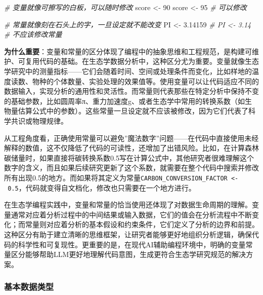 \documentclass[
  twoside]{book}
\newenvironment{Shaded}{\begin{snugshade}}{\end{snugshade}}
\newcommand{\CommentTok}[1]{\textcolor[rgb]{0.56,0.35,0.01}{\textit{#1}}}
\newcommand{\DecValTok}[1]{\textcolor[rgb]{0.00,0.00,0.81}{#1}}
\newcommand{\FloatTok}[1]{\textcolor[rgb]{0.00,0.00,0.81}{#1}}
\newcommand{\NormalTok}[1]{#1}
\newcommand{\OtherTok}[1]{\textcolor[rgb]{0.56,0.35,0.01}{#1}}
\begin{document}
\begin{Shaded}
\begin{Highlighting}[]
\CommentTok{\# 变量就像可擦写的白板，可以随时修改}
\NormalTok{score }\OtherTok{\textless{}{-}} \DecValTok{90}
\NormalTok{score }\OtherTok{\textless{}{-}} \DecValTok{95}  \CommentTok{\# 可以修改}

\CommentTok{\# 常量就像刻在石头上的字，一旦设定就不能改变}
\NormalTok{PI }\OtherTok{\textless{}{-}} \FloatTok{3.14159}
\CommentTok{\# PI \textless{}{-} 3.14  \# 不应该修改常量}
\end{Highlighting}
\end{Shaded}

\textbf{为什么重要}：变量和常量的区分体现了编程中的抽象思维和工程规范，是构建可维护、可复用代码的基础。在生态学数据分析中，这种区分尤为重要。变量就像生态学研究中的测量指标------它们会随着时间、空间或处理条件而变化，比如样地的温度读数、物种的个体数量、实验处理的效果值等。使用变量可以让代码适应不同的数据输入，实现分析的通用性和灵活性。而常量则代表那些在特定分析中保持不变的基础参数，比如圆周率π、重力加速度g、或者生态学中常用的转换系数（如生物量估算公式中的参数）。这些常量一旦设定就不应该被修改，因为它们代表了科学共识或物理规律。

从工程角度看，正确使用常量可以避免''魔法数字''问题------在代码中直接使用未经解释的数值，这不仅降低了代码的可读性，还增加了出错风险。比如，在计算森林碳储量时，如果直接将碳转换系数0.5写在计算公式中，其他研究者很难理解这个数字的含义，而且如果后续研究更新了这个系数，就需要在整个代码中搜索并修改所有出现0.5的地方。而如果将其定义为常量\texttt{CARBON\_CONVERSION\_FACTOR\ \textless{}-\ 0.5}，代码就变得自文档化，修改也只需要在一个地方进行。

在生态学编程实践中，变量和常量的恰当使用还体现了对数据生命周期的理解。变量通常对应着分析过程中的中间结果或输入数据，它们的值会在分析流程中不断变化；而常量则对应着分析的基本假设和约束条件，它们定义了分析的边界和前提。这种区分有助于建立清晰的思维框架，让研究者能够更好地组织分析逻辑，确保代码的科学性和可复现性。更重要的是，在现代AI辅助编程环境中，明确的变量常量区分能够帮助LLM更好地理解代码意图，生成更符合生态学研究规范的解决方案。

\hypertarget{ux57faux672cux6570ux636eux7c7bux578b}{%
\subsubsection{基本数据类型}\label{ux57faux672cux6570ux636eux7c7bux578b}}
\end{document}
